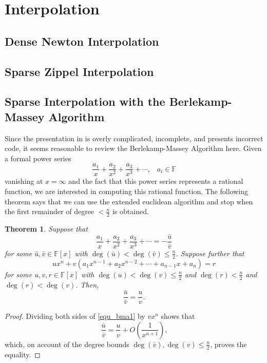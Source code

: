 \documentclass[12pt,reqno]{amsart}
\numberwithin{equation}{section}
\newtheorem{theorem}{Theorem}[section]
\newcommand{\op}[1]  { \operatorname{ #1 }}
\newcommand{\bbF}[0]  { \mathbb{F}}
\begin{document}
\section{Interpolation}

\subsection{Dense Newton Interpolation}

\subsection{Sparse Zippel Interpolation}

\subsection{Sparse Interpolation with the Berlekamp-Massey Algorithm}
Since the presentation in \cite{BMAR} is overly complicated, incomplete, and presents incorrect code, it seems reasonable to review the Berlekamp-Massey Algorithm here. Given a formal power series
\begin{equation*}
\frac{a_1}{x} + \frac{a_2}{x^2} + \frac{a_3}{x^3} + \cdots\text{,} \quad a_i \in \bbF
\end{equation*}
vanishing at $x = \infty$ and the fact that this power series represents a rational function, we are interested in computing this rational function. The following theorem says that we can use the extended euclidean algorithm and stop when the first remainder of degree $<\frac{n}{2}$ is obtained.

\begin{theorem}
Suppose that
\begin{equation*}
\frac{a_1}{x} + \frac{a_2}{x^2} + \frac{a_3}{x^3} + \cdots = -\frac{\bar{u}}{\bar{v}}
\end{equation*}
for some $\bar{u}, \bar{v} \in \bbF[x]$ with $\op{deg}(\bar{u}) < \op{deg}(\bar{v}) \le \frac{n}{2}$. Suppose further that
\begin{equation}
\label{equ_bma1}
u x^{n} + v (a_1 x^{n-1} + a_2 x^{n-2} + \cdots + a_{n-1} x + a_{n}) = r
\end{equation}
for some $u, v, r \in \bbF[x]$ with $\op{deg}(u) < \op{deg}(v) \le \frac{n}{2}$ and $\op{deg}(r) < \frac{n}{2}$ and $\op{deg}(r) < \op{deg}(v)$. Then,
\begin{equation*}
\frac{\bar{u}}{\bar{v}} = \frac{u}{v}\text{.}
\end{equation*}
\end{theorem}
\begin{proof}
Dividing both sides of \eqref{equ_bma1} by $v x^{n}$ shows that
\begin{equation*}
\frac{\bar{u}}{\bar{v}} = \frac{u}{v} + O \left( \frac{1}{x^{n+1}}\right)\text{,}
\end{equation*}
which, on account of the degree bounds $\op{deg}(\bar{v}), \op{deg}(v) \le \frac{n}{2}$, proves the equality.
\end{proof}
\end{document}
